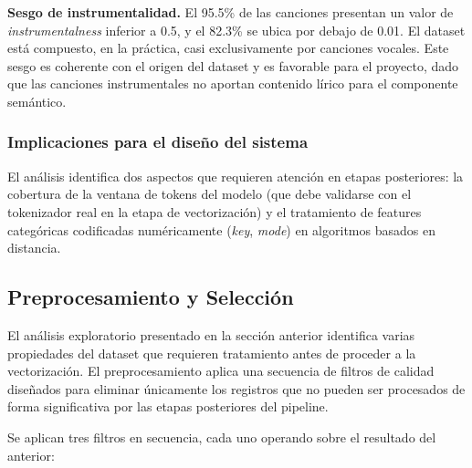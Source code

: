 \textbf{Sesgo de instrumentalidad.} El 95.5\% de las canciones presentan un valor de \textit{instrumentalness} inferior a 0.5, y el 82.3\% se ubica por debajo de 0.01. El dataset está compuesto, en la práctica, casi exclusivamente por canciones vocales. Este sesgo es coherente con el origen del dataset y es favorable para el proyecto, dado que las canciones instrumentales no aportan contenido lírico para el componente semántico.

\subsubsection*{Implicaciones para el diseño del sistema}

El análisis identifica dos aspectos que requieren atención en etapas posteriores: la cobertura de la ventana de tokens del modelo (que debe validarse con el tokenizador real en la etapa de vectorización) y el tratamiento de features categóricas codificadas numéricamente (\textit{key}, \textit{mode}) en algoritmos basados en distancia.

\subsection{Preprocesamiento y Selección}
\label{subsec:preprocesamiento}

El análisis exploratorio presentado en la sección anterior identifica varias propiedades del dataset que requieren tratamiento antes de proceder a la vectorización. El preprocesamiento aplica una secuencia de filtros de calidad diseñados para eliminar únicamente los registros que no pueden ser procesados de forma significativa por las etapas posteriores del pipeline.

Se aplican tres filtros en secuencia, cada uno operando sobre el resultado del anterior:

